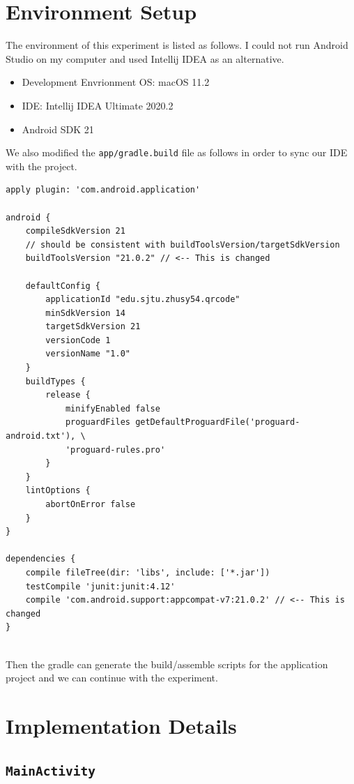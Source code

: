 \section{Environment Setup}


The environment of this experiment is listed as follows. I could not run Android Studio on my computer and used Intellij IDEA as an alternative.

\begin{itemize}
  \item Development Envrionment OS: macOS 11.2
  \item IDE: Intellij IDEA Ultimate 2020.2
  \item Android SDK 21
\end{itemize}

We also modified the \texttt{app/gradle.build} file as follows in order to sync our IDE with the project.

\begin{lstlisting}
apply plugin: 'com.android.application'

android {
    compileSdkVersion 21 
    // should be consistent with buildToolsVersion/targetSdkVersion
    buildToolsVersion "21.0.2" // <-- This is changed

    defaultConfig {
        applicationId "edu.sjtu.zhusy54.qrcode"
        minSdkVersion 14
        targetSdkVersion 21
        versionCode 1
        versionName "1.0"
    }
    buildTypes {
        release {
            minifyEnabled false
            proguardFiles getDefaultProguardFile('proguard-android.txt'), \
            'proguard-rules.pro'
        }
    }
    lintOptions {
        abortOnError false
    }
}

dependencies {
    compile fileTree(dir: 'libs', include: ['*.jar'])
    testCompile 'junit:junit:4.12'
    compile 'com.android.support:appcompat-v7:21.0.2' // <-- This is changed
}
    
\end{lstlisting}

Then the gradle can generate the build/assemble scripts for the application project and we can continue with the experiment.

\section{Implementation Details}

\subsection{\texttt{MainActivity}}

